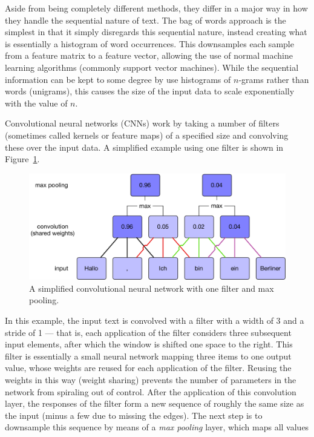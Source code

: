 Aside from being completely different methods, they differ in a major way in how
they handle the sequential nature of text. The bag of words approach is the
simplest in that it simply disregards this sequential nature, instead creating
what is essentially a histogram of word occurrences. This downsamples each
sample from a feature matrix to a feature vector, allowing the use of normal
machine learning algorithms (commonly support vector machines). While the
sequential information can be kept to some degree by use histograms of $n$-grams
rather than words (unigrams), this causes the size of the input data to scale
exponentially with the value of $n$.

Convolutional neural networks (CNNs) work by taking a number of filters
(sometimes called kernels or feature maps) of a specified size and convolving
these over the input data. A simplified example using one filter is shown in
Figure~\ref{fig:cnn}.
\begin{figure}[htb]
  \centering
  \includegraphics[width=\textwidth]{figures/cnn.pdf}
  \caption{A simplified convolutional neural network with one filter and
    max pooling.}
  \label{fig:cnn}
\end{figure}
In this example, the input text is convolved with a filter with a width of 3 and
a stride of 1 --- that is, each application of the filter considers three
subsequent input elements, after which the window is shifted one space to the
right. This filter is essentially a small neural network mapping three items to
one output value, whose weights are reused for each application of the filter.
Reusing the weights in this way (weight sharing) prevents the number of
parameters in the network from spiraling out of control.
\citep{lecun1995convolutional} After the application of this convolution layer,
the responses of the filter form a new sequence of roughly the same size as the
input (minus a few due to missing the edges). The next step is to downsample
this sequence by means of a \emph{max pooling} layer, which maps all values

